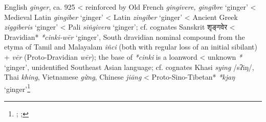 \begin{etymology}\label{ety:ginger}
English \textit{ginger}, ca. 925
< reinforced by Old French \textit{gingivere, gingibre } `ginger'
< Medieval Latin \textit{gingiber} `ginger'
< Latin \textit{zingiber} `ginger'
< Ancient Greek {} \textit{ziggiberis} `ginger'
< Pali \textit{siṅgivera } `ginger'; cf. cognates Sanskrit शृङ्गवेर 
< Dravidian* \textit{*cinki-wēr} `ginger', South dravidian nominal compound  from the etyma of Tamil and Malayalam \textit{iñci} (both with regular loss of an initial sibilant) + \textit{vēr} (Proto-Dravidian \textit{wēr}); the base of \textit{*cinki} is a loanword
< unknown \textit{*} `ginger', unidentified Southeast Asian language; cf. cognates Khasi \textit{sying} /sʔiŋ/, Thai \textit{khing}, Vietnamese \textit{gừng}, Chinese \textit{jiāng}
< Proto-Sino-Tibetan* \textit{*kjaŋ} `ginger'\footnote{\textcite{oed, ross_ginger_1952}; \textcite[5]{krishnamurti_dravidian_2003}; }
\end{etymology}